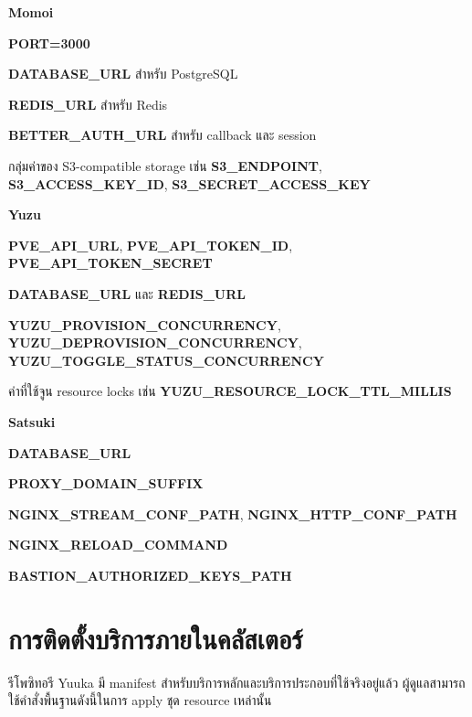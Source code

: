 \begin{mycustomenum2}
    \item \textbf{Momoi}
    \begin{mycustomenum2}
        \item \textbf{PORT=3000}
        \item \textbf{DATABASE\_URL} สำหรับ PostgreSQL
        \item \textbf{REDIS\_URL} สำหรับ Redis
        \item \textbf{BETTER\_AUTH\_URL} สำหรับ callback และ session
        \item กลุ่มค่าของ S3-compatible storage เช่น \textbf{S3\_ENDPOINT}, \textbf{S3\_ACCESS\_KEY\_ID}, \textbf{S3\_SECRET\_ACCESS\_KEY}
    \end{mycustomenum2}
    \item \textbf{Yuzu}
    \begin{mycustomenum2}
        \item \textbf{PVE\_API\_URL}, \textbf{PVE\_API\_TOKEN\_ID}, \textbf{PVE\_API\_TOKEN\_SECRET}
        \item \textbf{DATABASE\_URL} และ \textbf{REDIS\_URL}
        \item \textbf{YUZU\_PROVISION\_CONCURRENCY}, \textbf{YUZU\_DEPROVISION\_CONCURRENCY}, \textbf{YUZU\_TOGGLE\_STATUS\_CONCURRENCY}
        \item ค่าที่ใช้จูน resource locks เช่น \textbf{YUZU\_RESOURCE\_LOCK\_TTL\_MILLIS}
    \end{mycustomenum2}
    \item \textbf{Satsuki}
    \begin{mycustomenum2}
        \item \textbf{DATABASE\_URL}
        \item \textbf{PROXY\_DOMAIN\_SUFFIX}
        \item \textbf{NGINX\_STREAM\_CONF\_PATH}, \textbf{NGINX\_HTTP\_CONF\_PATH}
        \item \textbf{NGINX\_RELOAD\_COMMAND}
        \item \textbf{BASTION\_AUTHORIZED\_KEYS\_PATH}
    \end{mycustomenum2}
\end{mycustomenum2}

\section{การติดตั้งบริการภายในคลัสเตอร์}
\hspace*{1.3em}
รีโพซิทอรี Yuuka มี manifest สำหรับบริการหลักและบริการประกอบที่ใช้จริงอยู่แล้ว ผู้ดูแลสามารถใช้คำสั่งพื้นฐานดังนี้ในการ apply ชุด resource เหล่านั้น

